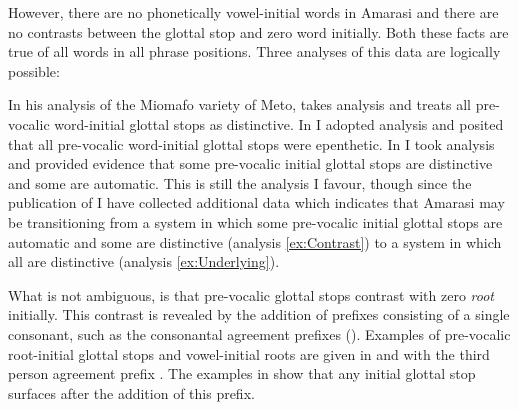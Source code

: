 However, there are no phonetically vowel-initial words in Amarasi
and there are no contrasts between the glottal stop and zero word initially.
Both these facts are true of all words in all phrase positions.
Three analyses of this data are logically possible:

\begin{exe}
	\label{ex:AnaIniGloSto}
\end{exe}

In his analysis of the Miomafo variety of Meto, \cite{st93,st96}
takes analysis  and treats all pre-vocalic word-initial
glottal stops as distinctive.
In \cite{ed16,ed16b} I adopted analysis  and posited that all
pre-vocalic word-initial glottal stops were epenthetic.
In \cite{ed17} I took analysis 
and provided evidence that some pre-vocalic initial
glottal stops are distinctive and some are automatic.
This is still the analysis I favour,
though since the publication of \cite{ed17}
I have collected additional data which indicates that Amarasi
may be transitioning from a system in which
some pre-vocalic initial glottal stops are automatic and some are distinctive
(analysis \ref{ex:Contrast}) to a system in which all are distinctive (analysis \ref{ex:Underlying}).

What is not ambiguous, is that pre-vocalic glottal
stops contrast with zero \emph{root} initially.
This contrast is revealed by the addition
of prefixes consisting of a single consonant,
such as the consonantal agreement prefixes ().
Examples of pre-vocalic root-initial glottal stops
and vowel-initial roots are given in 
and  with the third person agreement prefix .
The examples in  show that
any initial glottal stop surfaces after the addition of this prefix.

